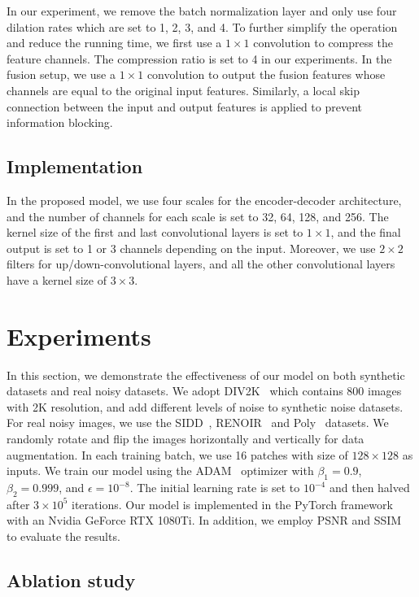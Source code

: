 \documentclass[runningheads]{llncs}
\begin{document}
In our experiment, we remove the batch normalization layer and only use four dilation rates which are set to 1, 2, 3, and 4. To further simplify the operation and reduce the running time, we first use a $1\times 1$ convolution to compress the feature channels. The compression ratio is set to 4 in our experiments. In the fusion setup, we use a $1\times 1$ convolution to output the fusion features whose channels are equal to the original input features. Similarly, a local skip connection between the input and output features is applied to prevent information blocking.

\subsection{Implementation}

In the proposed model, we use four scales for the encoder-decoder architecture, and the number of channels for each scale is set to 32, 64, 128, and 256. The kernel size of the first and last convolutional layers is set to $1\times 1$, and the final output is set to 1 or 3 channels depending on the input. Moreover, we use $2\times 2$ filters for up/down-convolutional layers, and all the other convolutional layers have a kernel size of $3\times 3$.
\section{Experiments}

In this section, we demonstrate the effectiveness of our model on both synthetic datasets and real noisy datasets. We adopt DIV2K~\cite{martin2001database} which contains 800 images with 2K resolution, and add different levels of noise to synthetic noise datasets. For real noisy images, we use the SIDD~\cite{abdelhamed2018high}, RENOIR~\cite{anaya2018renoir} and Poly~\cite{xu2018real} datasets. We randomly rotate and flip the images horizontally and vertically for data augmentation. In each training batch, we use 16 patches with size of $128 \times 128$ as inputs. We train our model using the ADAM~\cite{kingma2014adam} optimizer with $\beta_1=0.9$, $\beta_2=0.999$, and $\epsilon=10^{-8}$. The initial learning rate is set to $10^{-4}$ and then halved after $3\times 10^5$ iterations. Our model is implemented in the PyTorch framework~\cite{paszke2019pytorch} with an Nvidia GeForce RTX 1080Ti. In addition, we employ PSNR and SSIM~\cite{wang2004image} to evaluate the results.

\subsection{Ablation study}
\end{document}
